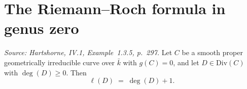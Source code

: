\section{The Riemann--Roch formula in genus zero}

\begin{theorem}


  \label{thm:riemannRoch_genus_zero}

  \textit{Source: Hartshorne, IV.1, Example~1.3.5, p.~297.}
  Let \(C\) be a smooth proper geometrically irreducible curve over
  \(\bar k\) with \(g(C) = 0\), and let \(D \in \mathrm{Div}(C)\) with
  \(\deg(D) \geq 0\). Then
  \[
    \ell(D) \;=\; \deg(D) + 1.
  \]
\end{theorem}

